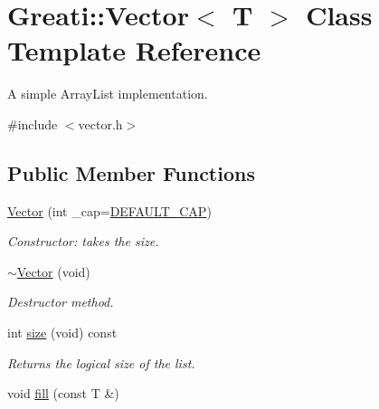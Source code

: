 \hypertarget{classGreati_1_1Vector}{}\section{Greati\+:\+:Vector$<$ T $>$ Class Template Reference}
\label{classGreati_1_1Vector}


A simple Array\+List implementation.  




{\ttfamily \#include $<$vector.\+h$>$}

\subsection*{Public Member Functions}
\begin{DoxyCompactItemize}
\item 
\hyperlink{classGreati_1_1Vector_a8d5c6c0fe7c2877cd5e01e45560f08f6}{Vector} (int \+\_\+cap=\hyperlink{classGreati_1_1Vector_a4f65eea1b021f9ed7a2e068e9022de5a}{D\+E\+F\+A\+U\+L\+T\+\_\+\+C\+AP})
\begin{DoxyCompactList}\small\item\em Constructor\+: takes the size. \end{DoxyCompactList}\item 
\hyperlink{classGreati_1_1Vector_a7ebef8d1de97be5220843160142b7932}{$\sim$\+Vector} (void)\hypertarget{classGreati_1_1Vector_a7ebef8d1de97be5220843160142b7932}{}\label{classGreati_1_1Vector_a7ebef8d1de97be5220843160142b7932}

\begin{DoxyCompactList}\small\item\em Destructor method. \end{DoxyCompactList}\item 
int \hyperlink{classGreati_1_1Vector_ad8f0b9700c7bf38f5fcca7455dbab180}{size} (void) const \hypertarget{classGreati_1_1Vector_ad8f0b9700c7bf38f5fcca7455dbab180}{}\label{classGreati_1_1Vector_ad8f0b9700c7bf38f5fcca7455dbab180}

\begin{DoxyCompactList}\small\item\em Returns the logical size of the list. \end{DoxyCompactList}\item 
void \hyperlink{classGreati_1_1Vector_a021abdb4453aedab2728052eb44a7719}{fill} (const T \&)\hypertarget{classGreati_1_1Vector_a021abdb4453aedab2728052eb44a7719}{}\label{classGreati_1_1Vector_a021abdb4453aedab2728052eb44a7719}


\end{DoxyCompactItemize}
